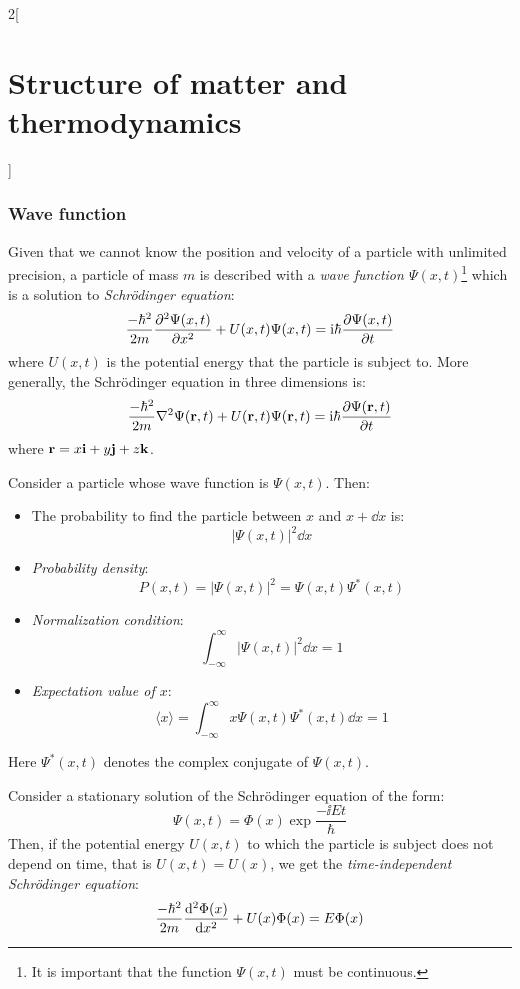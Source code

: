 \documentclass[../../../main.tex]{subfiles}
\begin{document}
\begin{multicols}{2}[\section{Structure of matter and thermodynamics}]
  \subsubsection{Wave function}
  \begin{definition}
    Given that we cannot know the position and velocity of a particle with unlimited precision, a particle of mass $m$ is described with a \textit{wave function $\Psi(x,t)$}\footnote{It is important that the function $\Psi(x,t)$ must be continuous.} which is a solution to \textit{Schrödinger equation}:
    $$\frac{-\hbar^2}{2m}\pdv[2]{\Psi(x,t)}{x}+U(x,t)\Psi(x,t)=\mathrm{i}\hbar\pdv{\Psi(x,t)}{t}$$
    where $U(x,t)$ is the potential energy that the particle is subject to. More generally, the Schrödinger equation in three dimensions is:
    $$\frac{-\hbar^2}{2m}\laplacian\Psi(\vectorfunction{r},t)+U(\vectorfunction{r},t)\Psi(\vectorfunction{r},t)=\ii\hbar\pdv{\Psi(\vectorfunction{r},t)}{t}$$ where $\boldsymbol{\mathrm{r}}=x\boldsymbol{\mathrm{i}}+y\boldsymbol{\mathrm{j}}+z\boldsymbol{\mathrm{k}}$.
  \end{definition}
  \begin{prop}
    Consider a particle whose wave function is $\Psi(x,t)$. Then:
    \begin{itemize}
      \item The probability to find the particle between $x$ and $x+\dd x$ is: $$|\Psi(x,t)|^2\dd x$$
      \item \textit{Probability density}: $$P(x,t)=|\Psi(x,t)|^2=\Psi(x,t)\Psi^*(x,t)$$
      \item \textit{Normalization condition}: $$\int_{-\infty}^\infty|\Psi(x,t)|^2\dd x=1$$
      \item \textit{Expectation value of $x$}: $$\langle x\rangle=\int_{-\infty}^\infty x\Psi(x,t)\Psi^*(x,t)\dd x=1$$
    \end{itemize}
    Here $\Psi^*(x,t)$ denotes the complex conjugate of $\Psi(x,t)$.
  \end{prop}
  \begin{definition}
    Consider a stationary solution of the Schrö\-din\-ger equation of the form: $$\Psi(x,t)=\Phi(x)\exp{\frac{-\ii Et}{\hbar}}$$
    Then, if the potential energy $U(x,t)$ to which the particle is subject does not depend on time, that is $U(x,t)=U(x)$, we get the \textit{time-independent Schrödinger equation}:
    \begin{equation}\label{SMT_schrodinger}
      \frac{-\hbar^2}{2m}\dv[2]{\Phi(x)}{x}+U(x)\Phi(x)=E\Phi(x)

\end{equation}
\end{definition}
\end{multicols}
\end{document}
